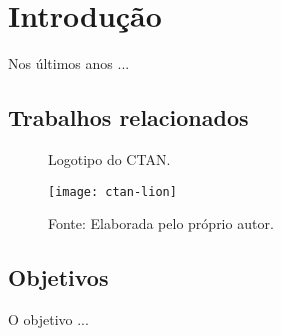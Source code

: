 \chapter{Introdução}
\label{cap:introducao}

Nos últimos anos ...

\section{Trabalhos relacionados}

\begin{figure}
  \centering
  \caption{Logotipo do CTAN. \label{fig:lion}}
  \texttt{[image: ctan-lion]}
  \caption*{Fonte: Elaborada pelo próprio autor.}
\end{figure}

\section{Objetivos}

O objetivo ...